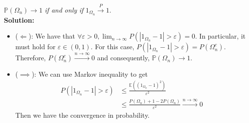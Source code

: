 \documentclass[11pt,letterpaper]{article}                  %
\begin{document}
\begin{problem}
$\mathbb{P}(\Omega_n)\rightarrow 1$ \textit{if and only if} $1_{\Omega_n} \overset{P}{\rightarrow}1$.\\

\textbf{Solution:}
\begin{itemize}
\item{($\Longleftarrow$)}: We have that $\forall \varepsilon>0, \lim_{n\to\infty} P(|1_{\Omega_n}-1|>\varepsilon)=0$. In particular, it must hold for $\varepsilon \in (0,1)$. For this case, $P(|1_{\Omega_n}-1|>\varepsilon)=P(\Omega_n^c)$. Therefore, $P(\Omega_n^c) \overset{n \to\infty}{\longrightarrow} 0$ and consequently, $\mathbb{P}(\Omega_n)\rightarrow 1$.

\item{($\implies$)}: We can use Markov inequality to get
\begin{align*}
P(|1_{\Omega_n}-1|>\varepsilon)&\leq \frac{\mathbb{E}((1_{\Omega_n}-1)^2)}{\varepsilon^2}\\
&\leq \frac{P(\Omega_n)+1-2P(\Omega_n)}{\varepsilon^2} \overset{n\to\infty}{\longrightarrow}0
\end{align*}
Then we have the convergence in probability.
\end{itemize}
\end{problem}
\end{document}
